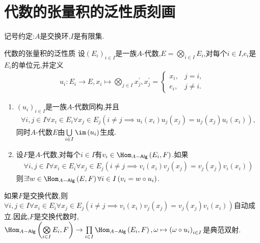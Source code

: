 \section{代数的张量积的泛性质刻画}

记号约定:$A$是交换环,$I$是有限集.

\begin{proposition}{代数的张量积的泛性质}{}
	设$\left(E_{i}\right)_{i\in I}$是一族$A$-代数,$E=\bigotimes\limits_{i\in I}E_{i}$,对每个$i\in I$,$e_{i}$是$E_{i}$的单位元,并定义
	\begin{align*}
		u_{i}:E_{i}\to E,x_{i}\mapsto\bigotimes\limits_{j\in I}x_{j}^{\prime},x_{j}^{\prime}=
		\begin{cases}
			x_{i},&j=i,\\
			e_{i},&j\neq i.
		\end{cases}
	\end{align*}
	\begin{enumerate}
		\item $\left(u_{i}\right)_{i\in I}$是一族$A$-代数同构,并且
		\begin{align*}
			\forall i,j\in I\forall x_{i}\in E_{i}\forall x_{j}\in E_{j}\left(i\neq j\implies u_{i}\left(x_{i}\right)u_{j}\left(x_{j}\right)=u_{j}\left(x_{j}\right)u_{i}\left(x_{i}\right)\right),
		\end{align*}
		同时$A$-代数$E$由$\bigcup\limits_{i\in I}\im\left(u_{i}\right)$生成.
		\item 设$F$是$A$-代数,对每个$i\in I$有$v_{i}\in\Hom_{A-\mathsf{Alg}}\left(E_{i},F\right)$.如果
		\begin{align*}
			\forall i,j\in I\forall x_{i}\in E_{i}\forall x_{j}\in E_{j}\left(i\neq j\implies v_{i}\left(x_{i}\right)v_{j}\left(x_{j}\right)=v_{j}\left(x_{j}\right)v_{i}\left(x_{i}\right)\right)
		\end{align*}
		则$\exists!w\in\Hom_{A-\mathsf{Alg}}\left(E,F\right)\forall i\in I\left(v_{i}=w\circ u_{i}\right)$.
	\end{enumerate}
\end{proposition}

\begin{remark}{}{}
	如果$F$是交换代数,则$\forall i,j\in I\forall x_{i}\in E_{i}\forall x_{j}\in E_{j}\left(i\neq j\implies v_{i}\left(x_{i}\right)v_{j}\left(x_{j}\right)=v_{j}\left(x_{j}\right)v_{i}\left(x_{i}\right)\right)$自动成立.因此,$F$是交换代数时,$\Hom_{A-\mathsf{Alg}}\left(\bigotimes\limits_{i\in I}E_{i},F\right)\to\prod\limits_{i\in I}\Hom_{A-\mathsf{Alg}}\left(E_{i},F\right),\omega\mapsto\left(\omega\circ u_{i}\right)_{i\in I}$是典范双射.
\end{remark}

